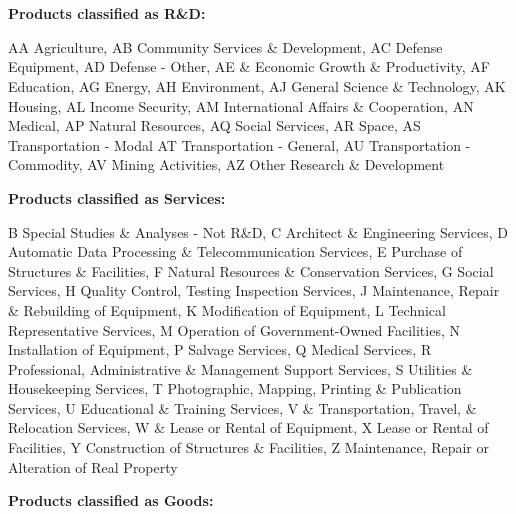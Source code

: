 \documentclass[dv_diss_main.tex]{subfiles}
\begin{document}
\\
\\
\noindent\textbf{Products classified as R\&D: }

AA Agriculture, AB Community Services \& Development, AC Defense Equipment, AD Defense - Other, AE & Economic Growth \& Productivity, AF Education, AG Energy, AH Environment, AJ  General Science \& Technology, AK Housing, AL Income Security, AM International Affairs \& Cooperation,
AN Medical, AP Natural Resources, AQ Social Services, AR Space, AS Transportation - Modal AT Transportation - General, AU  Transportation - Commodity, AV  Mining Activities, AZ  Other Research \& Development

\bigskip
\newline
\vspace{4}
\noindent\textbf{Products classified as Services:}

B Special Studies \& Analyses - Not R\&D, C Architect \& Engineering Services, D  Automatic Data Processing \& Telecommunication Services, E  Purchase of Structures \& Facilities, F Natural Resources \& Conservation Services, G Social Services, H Quality Control, Testing Inspection Services, J Maintenance, Repair \& Rebuilding of Equipment, K Modification of Equipment, L Technical Representative Services, M Operation of Government-Owned Facilities, N Installation of Equipment, P Salvage Services, Q  Medical Services, R Professional, Administrative \& Management Support Services, S Utilities \& Housekeeping Services, T  Photographic, Mapping, Printing \& Publication Services, U  Educational \& Training Services, V & Transportation, Travel, \& Relocation Services, W \& Lease or Rental of Equipment, X  Lease or Rental of Facilities, Y  Construction of Structures \& Facilities, Z  Maintenance, Repair or Alteration of Real Property

\newline
\bigskip
\vspace{4}
\noindent\textbf{Products classified as Goods: }
\end{document}
